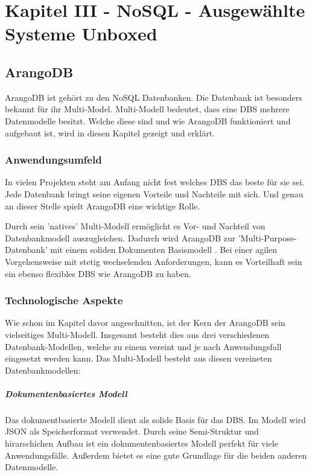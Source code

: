 \chapter{Kapitel III - NoSQL - Ausgewählte Systeme Unboxed}
\setcounter{section}{7}
\section{ArangoDB}
ArangoDB ist gehört zu den \ac{NoSQL} Datenbanken. Die Datenbank ist besonders bekannt für ihr Multi-Model. Multi-Modell bedeutet, dass eine \ac{DBS} mehrere Datenmodelle besitzt. Welche diese sind und wie ArangoDB funktioniert und aufgebaut ist, wird in diesen Kapitel gezeigt und erklärt.
\subsection{Anwendungsumfeld}
In vielen Projekten steht am Anfang nicht fest welches \ac{DBS} das beste für sie sei. Jede Datenbank bringt seine eigenen Vorteile und Nachteile mit sich. Und genau an dieser Stelle spielt ArangoDB eine wichtige Rolle. 

Durch sein 'natives' Multi-Modell ermöglicht es Vor- und Nachteil von Datenbankmodell auszugleichen. Dadurch wird ArangoDB zur 'Multi-Purpose-Datenbank' mit einem soliden Dokumenten Basismodell \citep{jaxenter01}. Bei einer agilen Vorgehensweise mit stetig wechselenden Anforderungen, kann es Vorteilhaft sein ein ebenso flexibles \ac{DBS} wie ArangoDB zu haben. 

 \subsection{Technologische Aspekte}
Wie schon im Kapitel davor angeschnitten, ist der Kern der ArangoDB sein vielseitiges Multi-Modell. Insgesamt besteht dies aus drei verschiedenen Datenbank-Modellen, welche zu einem vereint und je nach Anwendungsfall 
eingesetzt werden kann.
Das Multi-Modell besteht aus diesen vereineten Datenbankmodellen:
\paragraph{Dokumentenbasiertes Modell} Das dokumentbasierte Modell dient als solide Basis für das \ac{DBS}. Im Modell wird \ac{JSON} als Speicherformat verwendet. Durch seine Semi-Struktur und hirarschichen Aufbau ist  ein dokumentenbasiertes Modell perfekt für viele Anwendungsfälle\cite{AWS_doc}.  Außerdem bietet es eine gute Grundlage für die beiden anderen Datenmodelle.
